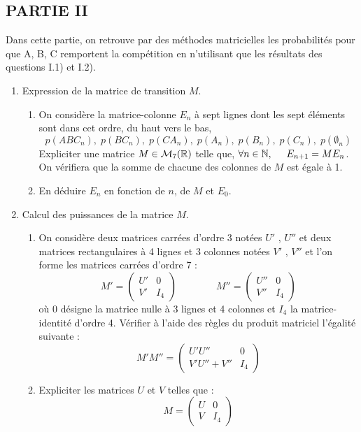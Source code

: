 \subsection*{PARTIE II}
Dans cette partie, on retrouve par des méthodes matricielles les probabilités pour que A, B, C remportent la compétition en n'utilisant que les résultats des questions I.1) et I.2).

\begin{enumerate}

\item  Expression de la matrice de transition $M$.
\begin{enumerate}
\item  On considère la matrice-colonne $E_n$ à sept lignes dont les sept éléments sont dans cet ordre, du haut vers le bas,
\begin{displaymath}
p(ABC_n),\; p(BC_n),\;p(CA_n),\; p(A_n),\; p(B_n),\;p(C_n),\;p(\emptyset_n)  
\end{displaymath}
Expliciter une matrice $M\in \mathcal{M}_{7}(\mathbb{R})$ telle que, 
$ \forall n\in \mathbb{N}, \hspace{0.5cm} E_{n+1} = ME_n $. 
On vérifiera que la somme de chacune des colonnes de $M$ est égale à 1.

\item  En déduire $E_n$ en fonction de $n$, de $M$ et $E_0$.
\end{enumerate}

\item  Calcul des puissances de la matrice $M$.
\begin{enumerate}
\item On considère deux matrices carrées d'ordre 3 notées $U'$ , $U''$ et deux matrices rectangulaires
à 4 lignes et 3 colonnes notées $V'$ , $V''$ et l'on forme les matrices carrées d'ordre 7 :
$$M'=\left(\begin{array}{cc}
U' & 0\\ V' & I_4
\end{array}\right)
\qquad \qquad
M''=\left(\begin{array}{cc}
U'' & 0\\ V''& I_4
\end{array}\right)$$
où $0$ désigne la matrice nulle à 3 lignes et 4 colonnes et $I_4$ la matrice-identité d'ordre 4.
Vérifier à l'aide des règles du produit matriciel l'égalité suivante :
$$M'M''=\left(\begin{array}{cc}
U'U'' & 0\\ V'U''+V''& I_4
\end{array}\right)$$
\item Expliciter les matrices $U$ et $V$ telles que :
\begin{displaymath}
 M=\left(\begin{array}{cc}
U & 0\\ V & I_4
\end{array}\right)  
\end{displaymath}


\end{enumerate}
\end{enumerate}
